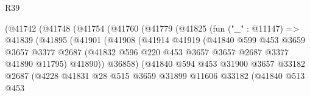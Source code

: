\begin{lexlean}{R39}
\begin{coremodule}
                          (@41742
                            (@41748
                              (@41754
                                (@41760
                                  (@41779
                                    (@41825
                                      (fun ("_" : @11147) =>
                                      @41839
                                        (@41895
                                          (@41901
                                            (@41908
                                              (@41914
                                                @41919
                                                (@41840
                                                  @599
                                                  @453
                                                  @3659
                                                  @3657
                                                  @3377
                                                  @2687
                                                  (@41832
                                                    @596
                                                    @220
                                                    @453
                                                    @3657
                                                    @3657
                                                    @2687
                                                    @3377
                                                    @41890
                                                    @11795)
                                                  @41890))
                                              @36858)
                                            (@41840
                                              @594
                                              @453
                                              @31900
                                              @3657
                                              @33182
                                              @2687
                                              (@4228
                                                @41831
                                                @28
                                                @515
                                                @3659
                                                @31899
                                                @11606
                                                @33182
                                                (@41840
                                                  @513
                                                  @453

\end{coremodule}
\end{lexlean}
